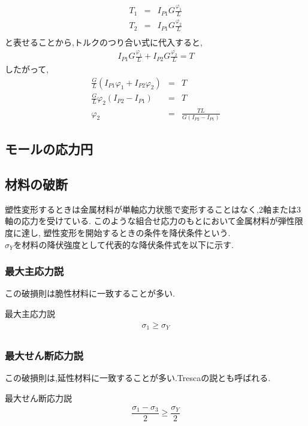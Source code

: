 \documentclass[a4paper]{jsarticle}
\begin{document}
\begin{enumerate}[(1)]
          \begin{eqnarray*}
              T_1&=&I_{P1}G\frac{\varphi_1}{L}\\
              T_2&=&I_{P1}G\frac{\varphi_2}{L}\\
          \end{eqnarray*}
          と表せることから,トルクのつり合い式に代入すると,
          \begin{eqnarray*}
              I_{P1}G\frac{\varphi_1}{L}+I_{P2}G\frac{\varphi_2}{L}=T
          \end{eqnarray*}
          したがって,
          \begin{eqnarray*}
              \frac{G}{L}\left(I_{P1}\varphi_1+I_{P2}\varphi_2\right)&=&T\\
              \frac{G}{L}\varphi_2\left(I_{P2}-I_{P1}\right)&=&T\\
              \varphi_2&=&\frac{TL}{G\left(I_{P2}-I_{P1}\right)}
          \end{eqnarray*}
\end{enumerate}
\subsection{モールの応力円}
\subsection{材料の破断}
塑性変形するときは金属材料が単軸応力状態で変形することはなく,2軸または3軸の応力を受けている.
このような組合せ応力のもとにおいて金属材料が弾性限度に達し,
塑性変形を開始するときの条件を降伏条件という.\\
$\sigma_Y$を材料の降伏強度として代表的な降伏条件式を以下に示す.
\subsubsection{最大主応力説}
この破損則は脆性材料に一致することが多い.
\begin{itembox}[l]{最大主応力説}
    \begin{eqnarray*}
        \sigma_1\geq\sigma_Y\\
    \end{eqnarray*}
\end{itembox}
\subsubsection{最大せん断応力説}
この破損則は,延性材料に一致することが多い.Trescaの説とも呼ばれる.
\begin{itembox}[l]{最大せん断応力説}
    \begin{eqnarray*}
        \dfrac{\sigma_1-\sigma_3}{2}\geq\dfrac{\sigma_Y}{2}\\
    \end{eqnarray*}
\end{itembox}
\end{document}
